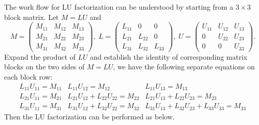 \documentclass[11pt, a4paper]{book}
\begin{document}
The work flow for LU factorization can be understood by starting from a $3\times 3$ block
matrix. Let $M = LU$ and
\begin{equation}
  M = \begin{pmatrix}
    M_{11} & M_{12} & M_{13} \\
    M_{21} & M_{22} & M_{23} \\
    M_{31} & M_{32} & M_{33}
  \end{pmatrix}, \;
  L = \begin{pmatrix}
    L_{11} & 0 & 0 \\
    L_{21} & L_{22} & 0 \\
    L_{31} & L_{32} & L_{33}
  \end{pmatrix}, \;
  U = \begin{pmatrix}
    U_{11} & U_{12} & U_{13} \\
    0 & U_{22} & U_{23} \\
    0 & 0 & U_{33}
  \end{pmatrix}.
\end{equation}
Expand the product of $LU$ and establish the identity of corresponding matrix blocks on
the two sides of $M=LU$, we have the following separate equations on each block row:
\begin{eqnarray}
  \label{eq:lu-3x3-row1} L_{11}U_{11} = M_{11} & L_{11}U_{12} = M_{12} & L_{11}U_{13} =M_{13} \\
  \label{eq:lu-3x3-row2} L_{21}U_{11} = M_{21} & L_{21}U_{12} + L_{22}U_{22} = M_{22} & L_{21}U_{13} +
                                                                                        L_{22}U_{23} = M_{23} \\
  \label{eq:lu-3x3-row3} L_{31}U_{11} = M_{31} & L_{31}U_{12} + L_{32}U_{22} = M_{32} & L_{31}U_{13} +
                                                                                        L_{32}U_{23} +
                                                                                        L_{33}U_{33} = M_{33}
\end{eqnarray}
Then the LU factorization can be performed as below.
\end{document}
